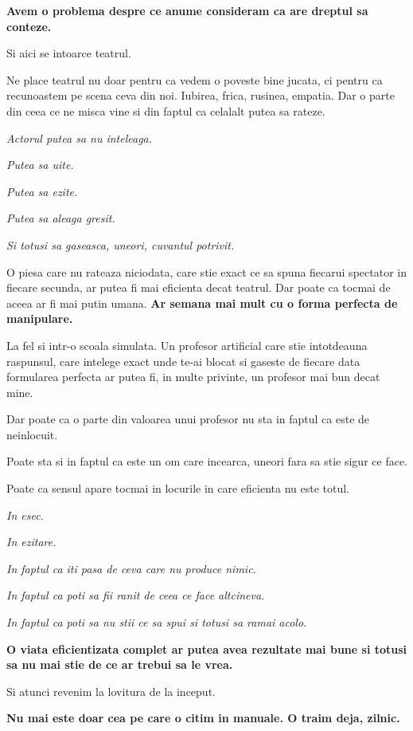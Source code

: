 \textbf{Avem o problema despre ce anume consideram ca are dreptul sa
conteze.}

Si aici se intoarce teatrul.

Ne place teatrul nu doar pentru ca vedem o poveste bine jucata, ci
pentru ca recunoastem pe scena ceva din noi. Iubirea, frica, rusinea,
empatia. Dar o parte din ceea ce ne misca vine si din faptul ca celalalt
putea sa rateze.

\textit{Actorul putea sa nu inteleaga.}

\textit{Putea sa uite.}

\textit{Putea sa ezite.}

\textit{Putea sa aleaga gresit.}

\textit{Si totusi sa gaseasca, uneori, cuvantul potrivit.}

O piesa care nu rateaza niciodata, care stie exact ce sa spuna fiecarui
spectator in fiecare secunda, ar putea fi mai eficienta decat teatrul.
Dar poate ca tocmai de aceea ar fi mai putin umana. \textbf{Ar semana
mai mult cu o forma perfecta de manipulare.}

La fel si intr-o scoala simulata. Un profesor artificial care stie
intotdeauna raspunsul, care intelege exact unde te-ai blocat si gaseste
de fiecare data formularea perfecta ar putea fi, in multe privinte, un
profesor mai bun decat mine.

Dar poate ca o parte din valoarea unui profesor nu sta in faptul ca este
de neinlocuit.

Poate sta si in faptul ca este un om care incearca, uneori fara sa stie
sigur ce face.

Poate ca sensul apare tocmai in locurile in care eficienta nu este
totul.

\textit{In esec.}

\textit{In ezitare.}

\textit{In faptul ca iti pasa de ceva care nu produce nimic.}

\textit{In faptul ca poti sa fii ranit de ceea ce face altcineva.}

\textit{In faptul ca poti sa nu stii ce sa spui si totusi sa ramai
acolo.}

\textbf{O viata eficientizata complet ar putea avea rezultate mai bune
si totusi sa nu mai stie de ce ar trebui sa le vrea.}

Si atunci revenim la lovitura de la inceput.

\textbf{Nu mai este doar cea pe care o citim in manuale. O traim deja,
zilnic.}

